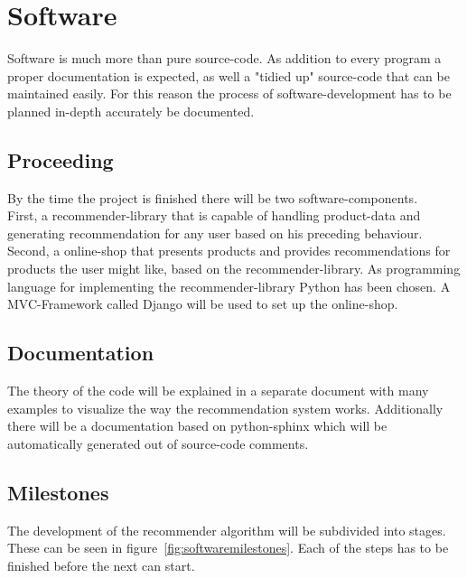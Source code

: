 

\section{Software}
Software is much more than pure source-code.
As addition to every program a proper documentation is expected, as well a "tidied up" source-code that can be maintained easily.
For this reason the process of software-development has to be planned in-depth accurately be documented.


\subsection{Proceeding}
By the time the project is finished there will be two software-components.\\
First, a recommender-library that is capable of handling product-data and generating recommendation for any user based on his preceding behaviour.
Second, a online-shop that presents products and provides recommendations for products the user might like, based on the recommender-library.
As programming language for implementing the recommender-library Python has been chosen.
A MVC-Framework called Django will be used to set up the online-shop.

\subsection{Documentation}
The theory of the code will be explained in a separate document with many examples to visualize the way the recommendation system works.
Additionally there will be a documentation based on python-sphinx which will be automatically generated out of source-code comments.


\subsection{Milestones}
The development of the recommender algorithm will be subdivided into stages.
These can be seen in figure~\ref{fig:softwaremilestones}.
Each of the steps has to be finished before the next can start.\\

